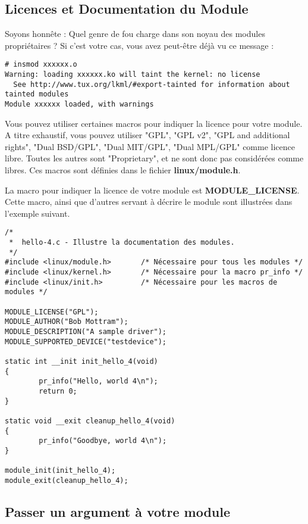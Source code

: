 \documentclass[11pt]{article}
\begin{document}
\subsection*{Licences et Documentation du Module}
\label{sec-4-4}

Soyons honnête : Quel genre de fou charge dans son noyau des modules propriétaires ? Si c'est votre cas, vous avez peut-être déjà vu ce message :

\begin{verbatim}
# insmod xxxxxx.o
Warning: loading xxxxxx.ko will taint the kernel: no license
  See http://www.tux.org/lkml/#export-tainted for information about tainted modules
Module xxxxxx loaded, with warnings
\end{verbatim}

Vous pouvez utiliser certaines macros pour indiquer la licence pour votre module. A titre exhaustif, vous pouvez utiliser "GPL", "GPL v2", "GPL and additional rights", "Dual BSD/GPL", "Dual MIT/GPL", "Dual MPL/GPL" comme licence libre. Toutes les autres sont "Proprietary", et ne sont donc pas considérées comme libres. Ces macros sont définies dans le fichier \textbf{linux/module.h}.

La macro pour indiquer la licence de votre module est \textbf{MODULE\_LICENSE}. Cette macro, ainsi que d'autres servant à décrire le module sont illustrées dans l'exemple suivant.

\begin{verbatim}
/*
 *  hello-4.c - Illustre la documentation des modules.
 */
#include <linux/module.h>       /* Nécessaire pour tous les modules */
#include <linux/kernel.h>       /* Nécessaire pour la macro pr_info */
#include <linux/init.h>         /* Nécessaire pour les macros de modules */

MODULE_LICENSE("GPL");
MODULE_AUTHOR("Bob Mottram");
MODULE_DESCRIPTION("A sample driver");
MODULE_SUPPORTED_DEVICE("testdevice");

static int __init init_hello_4(void)
{
        pr_info("Hello, world 4\n");
        return 0;
}

static void __exit cleanup_hello_4(void)
{
        pr_info("Goodbye, world 4\n");
}

module_init(init_hello_4);
module_exit(cleanup_hello_4);
\end{verbatim}

\subsection*{Passer un argument à votre module}
\label{sec-4-5}
\end{document}
